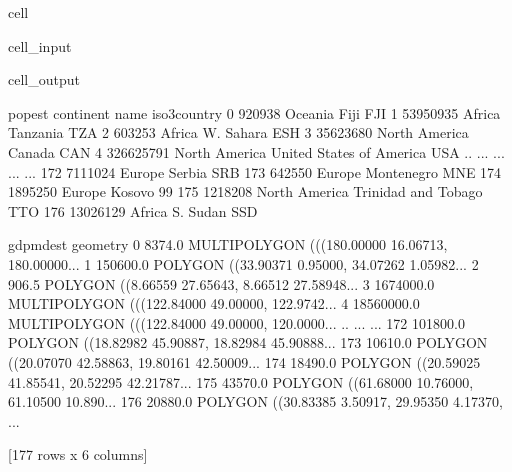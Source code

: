 \documentclass[letterpaper,10pt,english]{jupyterBook}
\begin{document}
\begin{sphinxuseclass}{cell}\begin{sphinxVerbatimInput}

\begin{sphinxuseclass}{cell_input}
\begin{sphinxVerbatim}[commandchars=\\\{\}]
\end{sphinxVerbatim}

\end{sphinxuseclass}\end{sphinxVerbatimInput}
\begin{sphinxVerbatimOutput}

\begin{sphinxuseclass}{cell_output}
\begin{sphinxVerbatim}[commandchars=\\\{\}]
       pop\PYGZus{}est      continent                      name iso3\PYGZus{}country  \PYGZbs{}
0       920938        Oceania                      Fiji          FJI   
1     53950935         Africa                  Tanzania          TZA   
2       603253         Africa                 W. Sahara          ESH   
3     35623680  North America                    Canada          CAN   
4    326625791  North America  United States of America          USA   
..         ...            ...                       ...          ...   
172    7111024         Europe                    Serbia          SRB   
173     642550         Europe                Montenegro          MNE   
174    1895250         Europe                    Kosovo          \PYGZhy{}99   
175    1218208  North America       Trinidad and Tobago          TTO   
176   13026129         Africa                  S. Sudan          SSD   

     gdp\PYGZus{}md\PYGZus{}est                                           geometry  
0        8374.0  MULTIPOLYGON (((180.00000 \PYGZhy{}16.06713, 180.00000...  
1      150600.0  POLYGON ((33.90371 \PYGZhy{}0.95000, 34.07262 \PYGZhy{}1.05982...  
2         906.5  POLYGON ((\PYGZhy{}8.66559 27.65643, \PYGZhy{}8.66512 27.58948...  
3     1674000.0  MULTIPOLYGON (((\PYGZhy{}122.84000 49.00000, \PYGZhy{}122.9742...  
4    18560000.0  MULTIPOLYGON (((\PYGZhy{}122.84000 49.00000, \PYGZhy{}120.0000...  
..          ...                                                ...  
172    101800.0  POLYGON ((18.82982 45.90887, 18.82984 45.90888...  
173     10610.0  POLYGON ((20.07070 42.58863, 19.80161 42.50009...  
174     18490.0  POLYGON ((20.59025 41.85541, 20.52295 42.21787...  
175     43570.0  POLYGON ((\PYGZhy{}61.68000 10.76000, \PYGZhy{}61.10500 10.890...  
176     20880.0  POLYGON ((30.83385 3.50917, 29.95350 4.17370, ...  

[177 rows x 6 columns]
\end{sphinxVerbatim}

\end{sphinxuseclass}\end{sphinxVerbatimOutput}

\end{sphinxuseclass}
\end{document}
